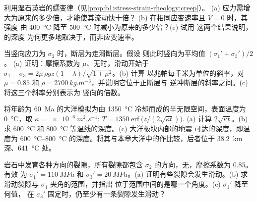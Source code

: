 \begin{exercise}[$\star\star$]\label{exo:b1:stress-strain-rheology:9}
利用湿石英岩的蠕变律（见\cref{prop:b1:stress-strain-rheology:creep}）。
(a) 应力需增大为原来的多少倍，才能使其流动快十倍？
(b) 在相同应变速率且 $V = 0$ 时，其强度
由 \qty{400}{\degreeCelsius} 降至 \qty{500}{\degreeCelsius} 时减小为原来的多少倍？(c) 试用
这两个结果说明，的深度
为何更多地取决于，而非应变速率。
\end{exercise}

\begin{exercise}[$\star\star\star$]\label{exo:b1:stress-strain-rheology:10}
 当竖向应力为 $\sigma_2$ 时，断层为走滑断层。假设
 则此时竖向为平均值 $(\sigma_1' + \sigma_3')/2$。
 (a) 证明：摩擦系数为 $\mu$、无时，滑动开始于
 $\sigma_1 - \sigma_3 = 2\mu\,\rho g z(1-\lambda)/\sqrt{1+\mu^2}$。(b) 计算
 以兆帕每千米为单位的斜率，对 $\mu = 0.85$ 和
 $\rho = \qty{2700}{kg.m^{-3}}$，并说明它位于正断层与
 逆冲断层的斜率之间。(c) 将这三个斜率分别表示为
 竖向的倍数。
\end{exercise}

\begin{exercise}[$\star\star\star$]\label{exo:b1:stress-strain-rheology:11}
 将年龄为 \qty{60}{Ma} 的大洋模拟为由
 \qty{1350}{\degreeCelsius} 冷却而成的半无限空间，表面温度为 \qty{0}{\degreeCelsius}，取
$\kappa = \qty{e-6}{m^2.s^{-1}}$: $T = \num{1350}\operatorname{erf}\bigl(z/(2\sqrt{\kappa t})\bigr)$.
 (a) 计算 $2\sqrt{\kappa t}$。(b) 求
 \qty{600}{\degreeCelsius} 和 \qty{800}{\degreeCelsius} 等温线的深度。(c) 大洋板块内部的地震
 可达的深度，即温度为
 \qtyrange{600}{800}{\degreeCelsius} 的深度。将其与本章大洋中的作比较，后者位于
 \qty{38.2}{km} 深、\qty{641}{\degreeCelsius} 处。
\end{exercise}

\begin{exercise}[$\star\star\star$]\label{exo:b1:stress-strain-rheology:12}
 岩石中发育各种方向的裂隙，所有裂隙都包含
 $\sigma_2$ 的方向，无，摩擦系数为 0.85。有效
 为 $\sigma_1' = \qty{110}{MPa}$ 和
 $\sigma_3' = \qty{20}{MPa}$。(a) 证明有些裂隙会发生滑动。(b) 求
 滑动裂隙与 $\sigma_1$ 夹角的范围，并指出
 位于范围中间的是哪一个角度。(c) $\sigma_1'$ 降至何值，
 在 $\sigma_3'$ 固定时，仍至少有一条裂隙发生滑动？
\end{exercise}

